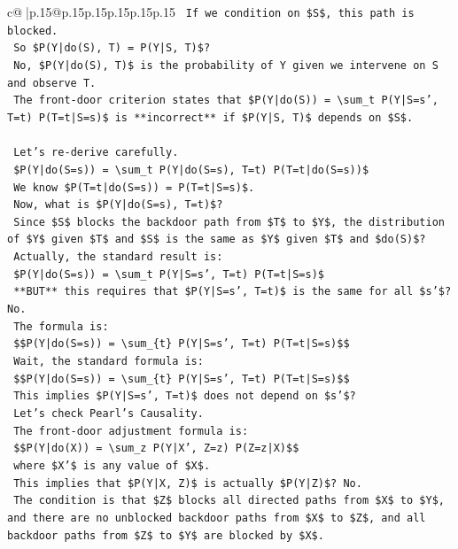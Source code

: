 \documentclass{article}
\begin{document}
{\begin{supertabular}{c@{$\;$}|p{.15\linewidth}@{}p{.15\linewidth}p{.15\linewidth}p{.15\linewidth}p{.15\linewidth}p{.15\linewidth}}
{{{\texttt{   If we condition on \$S\$, this path is blocked.} \\
\texttt{   So \$P(Y|do(S), T) = P(Y|S, T)\$?} \\
\texttt{   No, \$P(Y|do(S), T)\$ is the probability of Y given we intervene on S and observe T.} \\
\texttt{   The front{-}door criterion states that \$P(Y|do(S)) = \textbackslash{}sum\_t P(Y|S=s', T=t) P(T=t|S=s)\$ is **incorrect** if \$P(Y|S, T)\$ depends on \$S\$.} \\
\\ 
\texttt{   Let's re{-}derive carefully.} \\
\texttt{   \$P(Y|do(S=s)) = \textbackslash{}sum\_t P(Y|do(S=s), T=t) P(T=t|do(S=s))\$} \\
\texttt{   We know \$P(T=t|do(S=s)) = P(T=t|S=s)\$.} \\
\texttt{   Now, what is \$P(Y|do(S=s), T=t)\$?} \\
\texttt{   Since \$S\$ blocks the backdoor path from \$T\$ to \$Y\$, the distribution of \$Y\$ given \$T\$ and \$S\$ is the same as \$Y\$ given \$T\$ and \$do(S)\$?} \\
\texttt{   Actually, the standard result is:} \\
\texttt{   \$P(Y|do(S=s)) = \textbackslash{}sum\_t P(Y|S=s', T=t) P(T=t|S=s)\$} \\
\texttt{   **BUT** this requires that \$P(Y|S=s', T=t)\$ is the same for all \$s'\$? No.} \\
\texttt{   The formula is:} \\
\texttt{   \$\$P(Y|do(S=s)) = \textbackslash{}sum\_\{t\} P(Y|S=s', T=t) P(T=t|S=s)\$\$} \\
\texttt{   Wait, the standard formula is:} \\
\texttt{   \$\$P(Y|do(S=s)) = \textbackslash{}sum\_\{t\} P(Y|S=s', T=t) P(T=t|S=s)\$\$} \\
\texttt{   This implies \$P(Y|S=s', T=t)\$ does not depend on \$s'\$?} \\
\texttt{   Let's check Pearl's Causality.} \\
\texttt{   The front{-}door adjustment formula is:} \\
\texttt{   \$\$P(Y|do(X)) = \textbackslash{}sum\_z P(Y|X', Z=z) P(Z=z|X)\$\$} \\
\texttt{   where \$X'\$ is any value of \$X\$.} \\
\texttt{   This implies that \$P(Y|X, Z)\$ is actually \$P(Y|Z)\$? No.} \\
\texttt{   The condition is that \$Z\$ blocks all directed paths from \$X\$ to \$Y\$, and there are no unblocked backdoor paths from \$X\$ to \$Z\$, and all backdoor paths from \$Z\$ to \$Y\$ are blocked by \$X\$.} \\
}}}
\end{supertabular}}
\end{document}
